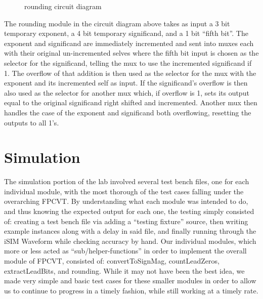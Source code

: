 \documentclass{article}
\begin{document}
\begin{figure}[H]
	\begin{center}
		\caption{rounding circuit diagram}
	\end{center}
\end{figure}

The rounding module in the circuit diagram above takes as input a 3 bit temporary exponent, a 4 bit temporary significand, and a 1 bit ``fifth bit''.  The exponent and significand are immediately incremented and sent into muxes each with their original un-incremented selves where the fifth bit input is chosen as the selector for the significand, telling the mux to use the incremented significand if 1.  The overflow of that addition is then used as the selector for the mux with the exponent and its incremented self as input.  If the significand's overflow is then also used as the selector for another mux which, if overflow is 1, sets its output equal to the original significand right shifted and incremented.  Another mux then handles the case of the exponent and significand both overflowing, resetting the outputs to all 1's. 


\section*{Simulation}


The simulation portion of the lab involved several test bench files, one for each individual module, with the most thorough of the test cases falling under the overarching FPCVT.  By understanding what each module was intended to do, and thus knowing the expected output for each one, the testing simply consisted of: creating a test bench file via adding a ``testing fixture'' source, then writing example instances along with a delay in said file, and finally running through the iSIM Waveform while checking accuracy by hand. Our individual modules, which more or less acted as ``sub/helper-functions'' in order to implement the overall module of FPCVT, consisted of: convertToSignMag, countLeadZeros, extractLeadBits, and rounding.  While it may not have been the best idea, we made very simple and basic test cases for these smaller modules in order to allow us to continue to progress in a timely fashion, while still working at a timely rate.  \\ 
\end{document}

